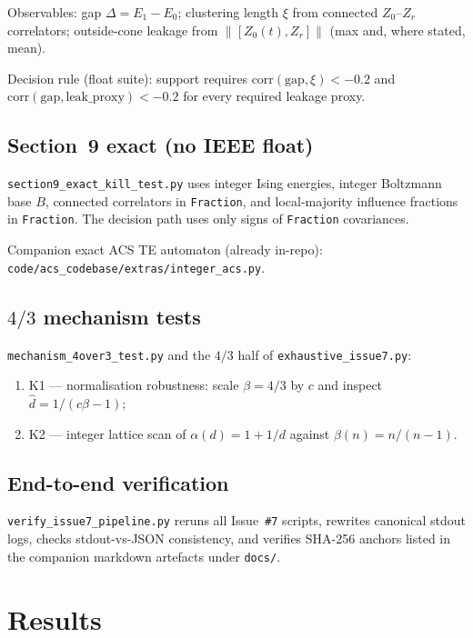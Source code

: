 \documentclass[11pt]{article}
\begin{document}
Observables: gap $\Delta=E_1-E_0$; clustering length $\xi$ from connected
$Z_0$--$Z_r$ correlators; outside-cone leakage from
$\|[Z_0(t),Z_r]\|$ (max and, where stated, mean).

Decision rule (float suite): support requires
$\mathrm{corr}(\mathrm{gap},\xi)<-0.2$ and
$\mathrm{corr}(\mathrm{gap},\mathrm{leak\_proxy})<-0.2$
for every required leakage proxy.

\subsection{Section~9 exact (no IEEE float)}

\nolinkurl{section9_exact_kill_test.py} uses integer Ising energies,
integer Boltzmann base $B$, connected correlators in
\texttt{Fraction}, and local-majority influence fractions in
\texttt{Fraction}.  The decision path uses only signs of
\texttt{Fraction} covariances.

Companion exact ACS TE automaton (already in-repo):
\nolinkurl{code/acs_codebase/extras/integer_acs.py}.

\subsection{$4/3$ mechanism tests}

\texttt{mechanism\_4over3\_test.py} and the $4/3$ half of
\texttt{exhaustive\_issue7.py}:
\begin{enumerate}[leftmargin=1.4em,itemsep=2pt]
  \item K1 --- normalisation robustness: scale $\beta=4/3$ by $c$ and
        inspect $\hat d=1/(c\beta-1)$;
  \item K2 --- integer lattice scan of $\alpha(d)=1+1/d$ against
        $\beta(n)=n/(n-1)$.
\end{enumerate}

\subsection{End-to-end verification}

\nolinkurl{verify_issue7_pipeline.py} reruns all Issue~\texttt{\#7}
scripts, rewrites canonical stdout logs, checks stdout-vs-JSON
consistency, and verifies SHA-256 anchors listed in the companion
markdown artefacts under \texttt{docs/}.

\section{Results}
\end{document}
